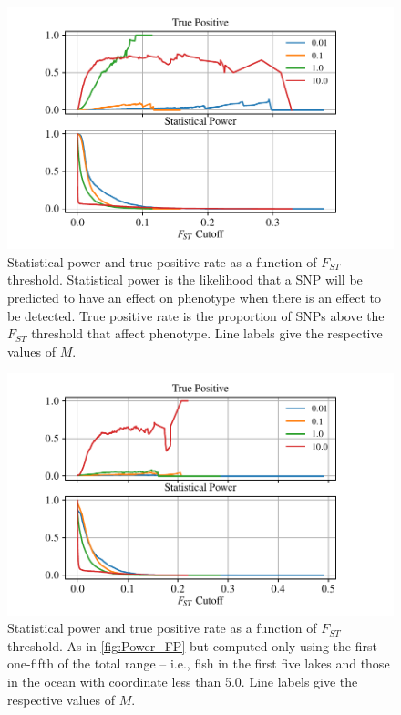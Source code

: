 \documentclass{article}
\begin{document}
\begin{figure}
    \begin{center}
          \includegraphics{Final_Plots/True_Power_0_25_500.pdf}
          \caption{ 
        Statistical power and true positive rate as a function of $F_{ST}$ threshold. 
        Statistical power is the likelihood that a SNP will be predicted to have an effect on phenotype when there is an effect to be detected.
        True positive rate is the proportion of SNPs above the $F_{ST}$ threshold that affect phenotype.
        Line labels give the respective values of $M$.
          \label{fig:Power_FP}
          }
    \end{center}
\end{figure}

\begin{figure}
    \begin{center}
        \includegraphics{Final_Plots/True_Power_0_5_500.pdf}
          \caption{ 
        Statistical power and true positive rate as a function of $F_{ST}$ threshold. As in \autoref{fig:Power_FP}
        but computed only using the first one-fifth of the total range -- i.e., fish in the first five lakes and those in the ocean with coordinate less than 5.0.
        Line labels give the respective values of $M$.
         	}
          \label{fig:Power_FP_5lakes}
    \end{center}
\end{figure}
\end{document}
